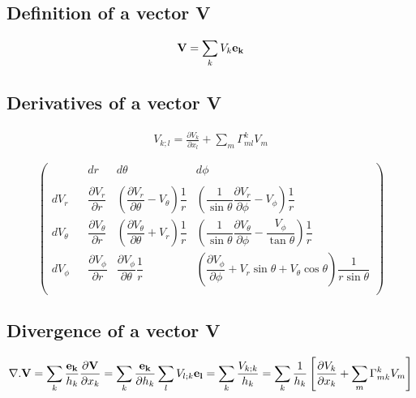 \documentclass[11pt]{article}
\begin{document}
\subsection{Definition of a vector {\bf{V}}}

\begin{align}
{\bf{V}} = \sum_k V_k {\bf{{e_k}}}
\end{align}

\subsection{Derivatives of a vector {\bf{V}}}

\begin{align}
V_{k;l} = \frac{\partial V_k}{\partial x_l} + \sum_m \Gamma_{ml}^k V_m
\end{align}

\[ \left( \begin{array}{cclcc}
          & & dr & d\theta & d\phi\\
          & &      &           &       \\
dV_r    & & \dfrac{\partial V_r}{\partial r} & \left(\dfrac{\partial V_r}{\partial \theta} - V_\theta \right)\dfrac{1}{r} & \left( \dfrac{1}{\sin{\theta}}\dfrac{\partial V_r}{\partial \phi} - V_\phi \right)\dfrac{1}{r}\\
dV_\theta & & \dfrac{\partial V_\theta}{\partial r}  & \left(\dfrac{\partial V_\theta}{\partial \theta} + V_r \right)\dfrac{1}{r}  & \left(\dfrac{1}{\sin{\theta}} \dfrac{\partial V_\theta}{\partial \phi} - \dfrac{V_\phi}{\tan{\theta}} \right)\dfrac{1}{r}\\
dV_\phi  & & \dfrac{\partial V_\phi}{\partial r} & \dfrac{\partial V_\phi}{\partial \theta}\dfrac{1}{r} & \left( \dfrac{\partial V_\phi}{\partial \phi} + V_r \sin{\theta} + V_\theta \cos{\theta} \right)\dfrac{1}{r\sin{\theta}}\\
\end{array} \right)\] 

\subsection{Divergence of a vector  {\bf{V}}}

\begin{align}
\nabla . {\bf{V}} = \sum_k \frac{{\bf{e_k}}}{h_k}\frac{\partial {\bf{V}}}{\partial x_k} =  \sum_k \frac{{\bf{e_k}}}{\partial h_k} \sum_l V_{l;k} {\bf{e_l}} = \sum_k \frac{V_{k;k}}{h_k} = \sum_k \frac{1}{h_k} \left[ \frac{\partial V_k}{\partial x_k} + \sum_m \Gamma_{mk}^k V_m \right] 
\end{align}
\end{document}
